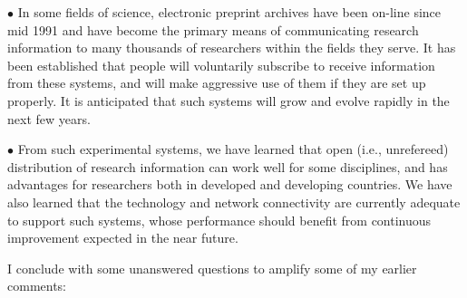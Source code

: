 \item{$\bullet$}
In some fields of science, electronic preprint archives have been on-line
since mid 1991 and have become the primary means of communicating research
information to many thousands of researchers within the fields they serve.
It has been established that people will voluntarily subscribe to receive
information from these systems, and will make aggressive use of them if they
are set up properly. It is anticipated that such systems will grow and evolve
rapidly in the next few years.

\item{$\bullet$}
{}From such experimental systems, we have learned that open (i.e., unrefereed)
distribution of research information can work well for some disciplines, and
has advantages for researchers both in developed and developing countries. We
have also learned that the technology and network connectivity are currently
adequate to support such systems, whose performance should benefit from
continuous improvement expected in the near future.


\bigskip\noindent
I conclude with some unanswered questions to amplify some of my earlier
comments:\smallskip

